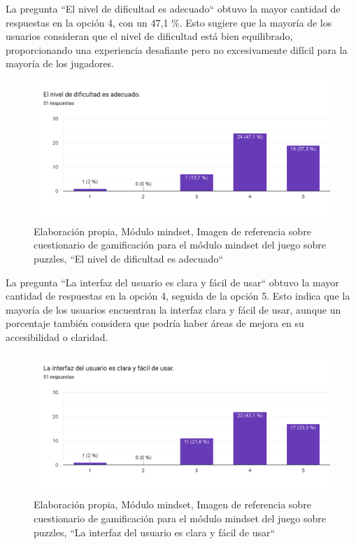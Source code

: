 La pregunta ``El nivel de dificultad es adecuado`` obtuvo la mayor cantidad de respuestas en la opción 4, con un 47,1 \%. Esto sugiere que la mayoría de los usuarios consideran que el nivel de dificultad está bien equilibrado, proporcionando una experiencia desafiante pero no excesivamente difícil para la mayoría de los jugadores.

\begin{figure}[H]
  \centering
  \includegraphics[width=0.7\linewidth]{Imagenes/mc3.png}
  \caption{Elaboración propia, Módulo mindset, Imagen de referencia sobre cuestionario de gamificación para el módulo mindset del juego sobre puzzles, ``El nivel de dificultad es adecuado``}
  \label{fig:cuestionario3mindset}
\end{figure}



La pregunta ``La interfaz del usuario es clara y fácil de usar`` obtuvo la mayor cantidad de respuestas en la opción 4, seguida de la opción 5. Esto indica que la mayoría de los usuarios encuentran la interfaz clara y fácil de usar, aunque un porcentaje también considera que podría haber áreas de mejora en su accesibilidad o claridad.

\begin{figure}[H]
  \centering
  \includegraphics[width=0.7\linewidth]{Imagenes/mc4.png}
  \caption{Elaboración propia, Módulo mindset, Imagen de referencia sobre cuestionario de gamificación para el módulo mindset del juego sobre puzzles, ``La interfaz del usuario es clara y fácil de usar``}
  \label{fig:cuestionario4mindset}
\end{figure}

